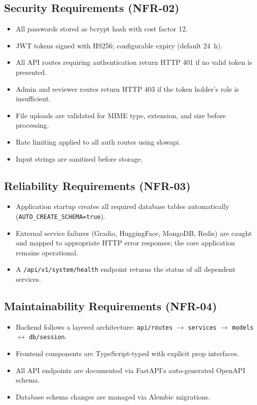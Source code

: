 \documentclass[12pt,a4paper]{report}
\begin{document}
\subsection{Security Requirements (NFR-02)}
\begin{itemize}
    \item All passwords stored as bcrypt hash with cost factor 12.
    \item JWT tokens signed with HS256; configurable expiry (default 24~h).
    \item All API routes requiring authentication return HTTP 401 if no valid token is presented.
    \item Admin and reviewer routes return HTTP 403 if the token holder's role is insufficient.
    \item File uploads are validated for MIME type, extension, and size before processing.
    \item Rate limiting applied to all auth routes using slowapi.
    \item Input strings are sanitised before storage.
\end{itemize}

\subsection{Reliability Requirements (NFR-03)}
\begin{itemize}
    \item Application startup creates all required database tables automatically (\texttt{AUTO\_CREATE\_SCHEMA=true}).
    \item External service failures (Gradio, HuggingFace, MongoDB, Redis) are caught and mapped to appropriate HTTP error responses; the core application remains operational.
    \item A \texttt{/api/v1/system/health} endpoint returns the status of all dependent services.
\end{itemize}

\subsection{Maintainability Requirements (NFR-04)}
\begin{itemize}
    \item Backend follows a layered architecture: \texttt{api/routes} $\rightarrow$ \texttt{services} $\rightarrow$ \texttt{models} $\leftrightarrow$ \texttt{db/session}.
    \item Frontend components are TypeScript-typed with explicit prop interfaces.
    \item All API endpoints are documented via FastAPI's auto-generated OpenAPI schema.
    \item Database schema changes are managed via Alembic migrations.
\end{itemize}
\end{document}
